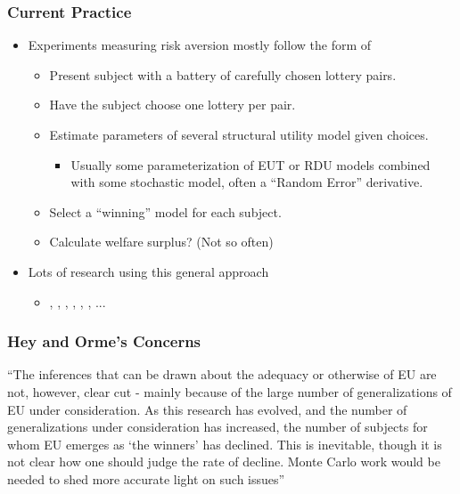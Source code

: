 \documentclass{beamer}
\begin{document}
\begin{frame}
\frametitle{Current Practice}
\begin{itemize}
	\item Experiments measuring risk aversion mostly follow the form of \textcite{Hey1994}
		\begin{itemize}
			\item Present subject with a battery of carefully chosen lottery pairs.
			\item Have the subject choose one lottery per pair.
			\item Estimate parameters of several structural utility model given choices.
				\begin{itemize}
					\item Usually some parameterization of EUT or RDU models combined with some stochastic model, often a \enquote{Random Error} derivative.
				\end{itemize}
			\item Select a \enquote{winning} model for each subject.
			\item Calculate welfare surplus? (Not so often)
		\end{itemize}
	\item Lots of research using this general approach
		\begin{itemize}
			\item \textcite{Hey1994, Hey1995, Hey2001}, \textcite{Loomes1995, Loomes1998}, \textcite{Conte2011}, \textcite{Harrison2005}, \textcite{Harrison2005a}, \textcite{Harrison2008}, \textcite{Harrison2016} ...
		\end{itemize}
\end{itemize}
\end{frame}

\begin{frame}
\frametitle{Hey and Orme's Concerns}
\enquote{The inferences that can be drawn \textelp{} about the adequacy or otherwise of EU are not, however, clear cut - mainly because of the large number of generalizations of EU under consideration.
As this research has evolved, and the number of generalizations under consideration has increased, the number of subjects for whom EU emerges as \enquote{the winners} has declined. 
This is inevitable, though it is not clear how one should judge the rate of decline.
\textelp{} Monte Carlo work would be needed to shed more accurate light on such issues}
\end{frame}
\end{document}
